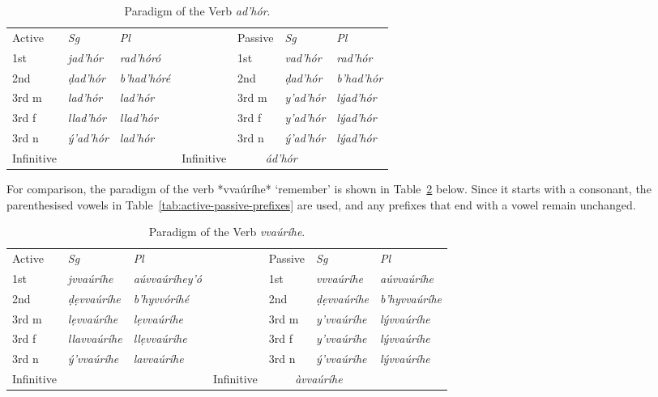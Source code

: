 \documentclass[a4paper, 12pt, oneside, final]{article}
\let \nf \normalfont
\def \d {ḍ}
\begin{document}
\begin{table}[H]
\centering
\noindent\begin{tabular}{@{}|>{}l|>{\it}l|>{\it}l|>{}l|>{}l|>{\it}l|>{\it}l|}\cline{1-3}\cline{5-7}
\nf Active&\nf Sg&\nf Pl&\nf &\nf Passive&\nf Sg&\nf Pl\\\cline{1-3}\cline{5-7}
1st&jad’hór&rad’hóró&&1st&vad’hór&rad’hór\\\cline{1-3}\cline{5-7}
2nd&\d{}ad’hór&b’had’hóré&&2nd&\d{}ad’hór&b’had’hór\\\cline{1-3}\cline{5-7}
3rd m&lad’hór&lad’hór&&3rd m&y’ad’hór&lýad’hór\\\cline{1-3}\cline{5-7}
3rd f&llad’hór&llad’hór&&3rd f&y’ad’hór &lýad’hór\\\cline{1-3}\cline{5-7}
3rd n&ý’ad’hór&lad’hór&&3rd n&ý’ad’hór&lýad’hór\\\cline{1-3}\cline{5-7}
Infinitive&\multicolumn{2}{c|}{\it dad’hór}&&Infinitive&\multicolumn{2}{c|}{\it ád’hór}\\\cline{1-3}\cline{5-7}
\end{tabular}
\caption{Paradigm of the Verb \emph{ad’hór}.}\label{tab:adhor-paradigm}
\end{table}

\noindent For comparison, the paradigm of the verb *vvaúríhe* ‘remember’ is shown in Table~\ref{tab:vvorihe-paradigm} below.
Since it starts with a consonant, the parenthesised vowels in Table~\ref{tab:active-passive-prefixes} are used, and any
prefixes that end with a vowel remain unchanged.

\begin{table}[H]
\centering
\noindent\begin{tabular}{@{}|>{}l|>{\it}l|>{\it}l|>{}l|>{}l|>{\it}l|>{\it}l|}\cline{1-3}\cline{5-7}
\nf Active&\nf Sg&\nf Pl&\nf &\nf Passive&\nf Sg&\nf Pl\\\cline{1-3}\cline{5-7}
1st&jvvaúríhe&aúvvaúríhey’ó&&1st&vvvaúríhe&aúvvaúríhe\\\cline{1-3}\cline{5-7}
2nd&ḍẹvvaúríhe&b’hyvvóríhé&&2nd&ḍẹvvaúríhe&b’hyvvaúríhe\\\cline{1-3}\cline{5-7}
3rd m&lẹvvaúríhe&lẹvvaúríhe&&3rd m&y’vvaúríhe&lývvaúríhe\\\cline{1-3}\cline{5-7}
3rd f&llavvaúríhe&llẹvvaúríhe&&3rd f&y’vvaúríhe&lývvaúríhe\\\cline{1-3}\cline{5-7}
3rd n&ý’vvaúríhe&lavvaúríhe&&3rd n&ý’vvaúríhe&lývvaúríhe\\\cline{1-3}\cline{5-7}
Infinitive&\multicolumn{2}{c|}{\it dẹvvaúríhe}&&Infinitive&\multicolumn{2}{c|}{\it àvvaúríhe}\\\cline{1-3}\cline{5-7}
\end{tabular}
\caption{Paradigm of the Verb \emph{vvaúríhe}.}\label{tab:vvorihe-paradigm}
\end{table}
\end{document}

